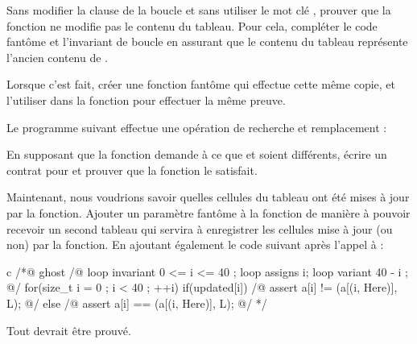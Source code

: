 

Sans modifier la clause  de la boucle et sans utiliser le mot
clé , prouver que la fonction ne modifie pas le
contenu du tableau. Pour cela, compléter le code fantôme et l'invariant de boucle
en assurant que le contenu du tableau  représente l'ancien contenu
de .


Lorsque c'est fait, créer une fonction fantôme qui effectue cette même copie, et
l'utiliser dans la fonction  pour effectuer la même preuve.




Le programme suivant effectue une opération de recherche et remplacement :




En supposant que la fonction  demande à ce que
 et  soient différents, écrire un contrat pour
 et prouver que la fonction le satisfait.


Maintenant, nous voudrions savoir quelles cellules du tableau ont été mises à
jour par la fonction. Ajouter un paramètre fantôme à la fonction
 de manière à pouvoir recevoir un second tableau qui servira
à enregistrer les cellules mise à jour (ou non) par la fonction. En ajoutant
également le code suivant après l'appel à  :


\begin{CodeBlock}{c}
  /*@ ghost
    /@ loop invariant 0 <= i <= 40 ;
       loop assigns i;
       loop variant 40 - i ;
    @/
    for(size_t i = 0 ; i < 40 ; ++i){
      if(updated[i]){
        /@ assert a[i] != \at(a[\at(i, Here)], L); @/
      } else {
        /@ assert a[i] == \at(a[\at(i, Here)], L); @/
      }
    }
  */
  \end{CodeBlock}


  Tout devrait être prouvé.
